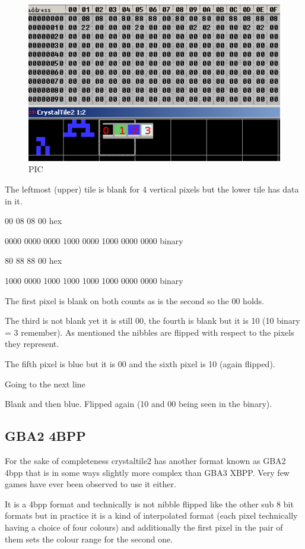 \documentclass[
]{book}
\begin{document}
\begin{figure}
\centering
\includegraphics{images/24_home_fast6191_romhackingguide_unrenamed_file___original_borders_romhackingguide2dGBA3XBPP2.png}
\caption{PIC}
\end{figure}

The leftmost (upper) tile is blank for 4 vertical pixels but the lower tile has data in it.

00 08 08 00 hex

0000 0000 0000 1000 0000 1000 0000 0000 binary

80 88 88 00 hex

1000 0000 1000 1000 1000 1000 0000 0000 binary

The first pixel is blank on both counts as is the second so the 00 holds.

The third is not blank yet it is still 00, the fourth is blank but it is 10 (10 binary = 3 remember). As mentioned the nibbles are flipped with respect to the pixels they represent.

The fifth pixel is blue but it is 00 and the sixth pixel is 10 (again flipped).

Going to the next line

Blank and then blue. Flipped again (10 and 00 being seen in the binary).

\hypertarget{gba2-4bpp}{%
\subsection{GBA2 4BPP}\label{gba2-4bpp}}

For the sake of completeness crystaltile2 has another format known as GBA2 4bpp that is in some ways slightly more complex than GBA3 XBPP. Very few games have ever been observed to use it either.

It is a 4bpp format and technically is not nibble flipped like the other sub 8 bit formats but in practice it is a kind of interpolated format (each pixel technically having a choice of four colours) and additionally the first pixel in the pair of them sets the colour range for the second one.
\end{document}
